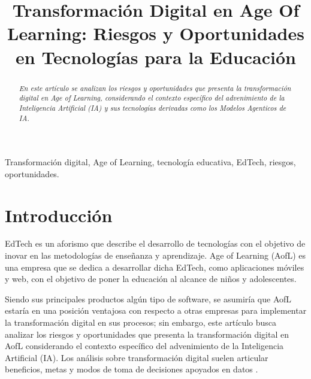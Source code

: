 \documentclass[conference]{IEEEtran}
\newcommand{\PaperTitle}{Transformación Digital en Age Of Learning: Riesgos y Oportunidades en Tecnologías para la Educación}
\begin{document}
\renewcommand{\abstractname}{Resumen}
\renewcommand{\IEEEkeywordsname}{Términos clave}
\renewcommand{\refname}{Referencias}

\title{\PaperTitle\\
}

\author{
}

\maketitle

\begin{abstract}
\textit{En este artículo se analizan los riesgos y oportunidades que presenta la transformación digital en Age of Learning, considerando el contexto específico del advenimiento de la Inteligencia Artificial (IA) y sus tecnologías derivadas como los Modelos Agenticos de IA.}
\end{abstract}

\begin{IEEEkeywords}
Transformación digital, Age of Learning, tecnología educativa, EdTech, riesgos, oportunidades.
\end{IEEEkeywords}

\section{Introducción}
EdTech es un aforismo que describe el desarrollo de tecnologías con el objetivo de inovar en las metodologías de enseñanza y aprendizaje. Age of Learning (AofL) es una empresa que se dedica a desarrollar dicha EdTech, como aplicaciones móviles y  web, con el objetivo de poner la educación al alcance de niños y adolescentes. \cite{ageOfLearningLinkedIn}

Siendo sus principales productos algún tipo de software, se asumiría que AofL estaría en una posición ventajosa con respecto a otras empresas para implementar la transformación digital en sus procesos; sin embargo, este artículo busca analizar los riesgos y oportunidades que presenta la transformación digital en AofL considerando el contexto específico del advenimiento de la Inteligencia Artificial (IA). Los análisis sobre transformación digital suelen articular beneficios, metas y modos de toma de decisiones apoyados en datos \cite{mindmap2021dt}.
\end{document}
